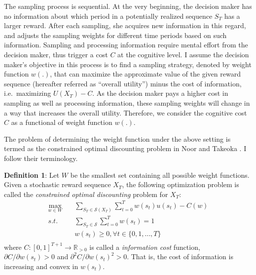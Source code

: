 \documentclass[
  12pt,
]{article}
\begin{document}
The sampling process is sequential. At the very beginning, the decision
maker has no information about which period in a potentially realized
sequence \(S_T\) has a larger reward. After each sampling, she acquires
new information in this regard, and adjusts the sampling weights for
different time periods based on such information. Sampling and
processing information require mental effort from the decision maker,
thus trigger a cost \(C\) at the cognitive level. I assume the decision
maker's objective in this process is to find a sampling strategy,
denoted by weight function \(w(.)\), that can maximize the approximate
value of the given reward sequence (hereafter referred as ``overall
utility'') minus the cost of information, i.e.~maximizing \(U(X_T)-C\).
As the decision maker pays a higher cost in sampling as well as
processing information, these sampling weights will change in a way that
increases the overall utility. Therefore, we consider the cognitive cost
\(C\) as a functional of weight function \(w(.)\).

The problem of determining the weight function under the above setting
is termed as the constrained optimal discounting problem in Noor and
Takeoka
\citetext{\citeyear{noor_optimal_2022}; \citeyear{noor_constrained_2023}}.
I follow their terminology.

\textbf{Definition 1}: Let \(W\) be the smallest set containing all
possible weight functions. Given a stochastic reward sequence \(X_T\),
the following optimization problem is called the \emph{constrained
optimal discounting} problem for \(X_T\):\[ 
\begin{aligned}
\max_{w\in W}  \quad & \sum_{S_T\in \mathcal{S}(X_T)}\sum_{t=0}^T w(s_t)u(s_t) - C(w) \\
s.t. \quad &  \sum_{S_T\in \mathcal{S}}\sum_{t=0}^T w(s_t)=1 \\
& w(s_t)\geq 0, \forall t\in\{0,1,…,T\} \\
\end{aligned}
\]where \(C:[0,1]^{T+1}\rightarrow \mathbb{R}_{>0}\) is called a
\emph{information cost} function, \(\partial C/\partial w(s_t)>0\) and
\(\partial^2 C/\partial w(s_t)^2>0\). That is, the cost of information
is increasing and convex in \(w(s_t)\).
\end{document}
